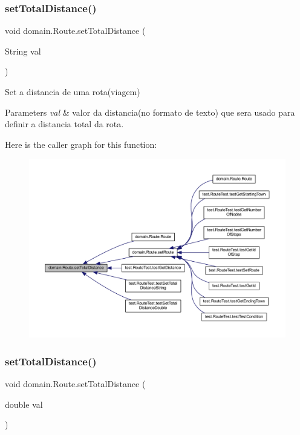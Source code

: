 \subsubsection{\texorpdfstring{set\+Total\+Distance()}{setTotalDistance()}\hspace{0.1cm}{\footnotesize\ttfamily [1/2]}}
{\footnotesize\ttfamily void domain.\+Route.\+set\+Total\+Distance (\begin{DoxyParamCaption}\item[{String}]{val }\end{DoxyParamCaption})}

Set a distancia de uma rota(viagem)


\begin{DoxyParams}{Parameters}
{\em val} & valor da distancia(no formato de texto) que sera usado para definir a distancia total da rota. \\
\hline
\end{DoxyParams}
Here is the caller graph for this function\+:\nopagebreak
\begin{figure}[H]
\begin{center}
\leavevmode
\includegraphics[width=350pt]{classdomain_1_1_route_a33d5c5c64f0fdb4a0317ec0019bedc5a_icgraph}
\end{center}
\end{figure}
\mbox{\label{classdomain_1_1_route_a263bcca7d34766e0ba9ed86651c5a212}} 
\subsubsection{\texorpdfstring{set\+Total\+Distance()}{setTotalDistance()}\hspace{0.1cm}{\footnotesize\ttfamily [2/2]}}
{\footnotesize\ttfamily void domain.\+Route.\+set\+Total\+Distance (\begin{DoxyParamCaption}\item[{double}]{val }\end{DoxyParamCaption})}

